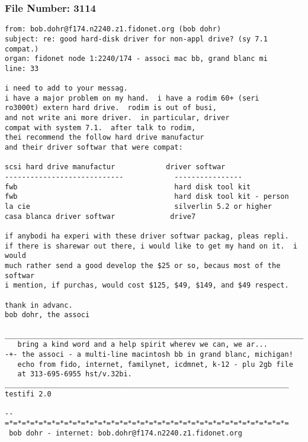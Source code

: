 \subsubsection*{File Number: 3114}
\scriptsize\begin{verbatim}
from: bob.dohr@f174.n2240.z1.fidonet.org (bob dohr)
subject: re: good hard-disk driver for non-appl drive? (sy 7.1 compat.)
organ: fidonet node 1:2240/174 - associ mac bb, grand blanc mi
line: 33

i need to add to your messag.
i have a major problem on my hand.  i have a rodim 60+ (seri
ro3000t) extern hard drive.  rodim is out of busi, 
and not write ani more driver.  in particular, driver 
compat with system 7.1.  after talk to rodim, 
thei recommend the follow hard drive manufactur 
and their driver softwar that were compat:
 
scsi hard drive manufactur            driver softwar
----------------------------            ----------------
fwb                                     hard disk tool kit
fwb                                     hard disk tool kit - person
la cie                                  silverlin 5.2 or higher
casa blanca driver softwar             drive7
 
if anybodi ha experi with these driver softwar packag, pleas repli.
if there is sharewar out there, i would like to get my hand on it.  i would
much rather send a good develop the $25 or so, becaus most of the softwar
i mention, if purchas, would cost $125, $49, $149, and $49 respect.

thank in advanc.
bob dohr, the associ

_______________________________________________________________________________
   bring a kind word and a help spirit wherev we can, we ar...
-+- the associ - a multi-line macintosh bb in grand blanc, michigan!
   echo from fido, internet, familynet, icdmnet, k-12 - plu 2gb file
   at 313-695-6955 hst/v.32bi.
___________________________________________________________________ testifi 2.0

--  
=*=*=*=*=*=*=*=*=*=*=*=*=*=*=*=*=*=*=*=*=*=*=*=*=*=*=*=*=*=*=*=*=*=
 bob dohr - internet: bob.dohr@f174.n2240.z1.fidonet.org
\end{verbatim}
